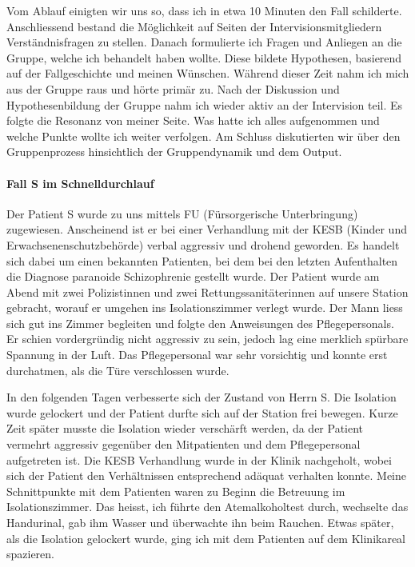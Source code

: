 Vom Ablauf einigten wir uns so, dass ich in etwa 10 Minuten den Fall schilderte. Anschliessend bestand die Möglichkeit auf Seiten der Intervisionsmitgliedern Verständnisfragen zu stellen. Danach formulierte ich Fragen und Anliegen an die Gruppe, welche ich behandelt haben wollte. Diese bildete Hypothesen, basierend auf der Fallgeschichte und meinen Wünschen. Während dieser Zeit nahm ich mich aus der Gruppe raus und hörte primär zu. Nach der Diskussion und Hypothesenbildung der Gruppe nahm ich wieder aktiv an der Intervision teil. Es folgte die Resonanz von meiner Seite. Was hatte ich alles aufgenommen und welche Punkte wollte ich weiter verfolgen. Am Schluss diskutierten wir über den Gruppenprozess hinsichtlich der Gruppendynamik und dem Output.

\paragraph{Fall S im Schnelldurchlauf}
Der Patient S wurde zu uns mittels FU (Fürsorgerische Unterbringung) zugewiesen. Anscheinend ist er bei einer Verhandlung mit der KESB (Kinder und Erwachsenenschutzbehörde) verbal aggressiv und drohend geworden. Es handelt sich dabei um einen bekannten Patienten, bei dem bei den letzten Aufenthalten die Diagnose paranoide Schizophrenie gestellt wurde. Der Patient wurde am Abend mit zwei Polizistinnen und zwei Rettungssanitäterinnen auf unsere Station gebracht, worauf er umgehen ins Isolationszimmer verlegt wurde. Der Mann liess sich gut ins Zimmer begleiten und folgte den Anweisungen des Pflegepersonals. Er schien vordergründig nicht aggressiv zu sein, jedoch lag eine merklich spürbare Spannung in der Luft. Das Pflegepersonal war sehr vorsichtig und konnte erst durchatmen, als die Türe verschlossen wurde.

In den folgenden Tagen verbesserte sich der Zustand von Herrn S. Die Isolation wurde gelockert und der Patient durfte sich auf der Station frei bewegen. Kurze Zeit später musste die Isolation wieder verschärft werden, da der Patient vermehrt aggressiv gegenüber den Mitpatienten und dem Pflegepersonal aufgetreten ist. Die KESB Verhandlung wurde in der Klinik nachgeholt, wobei sich der Patient den Verhältnissen entsprechend adäquat verhalten konnte. 
Meine Schnittpunkte mit dem Patienten waren zu Beginn die Betreuung im Isolationszimmer. Das heisst, ich führte den Atemalkoholtest durch, wechselte das Handurinal, gab ihm Wasser und überwachte ihn beim Rauchen. Etwas später, als die Isolation gelockert wurde, ging ich mit dem Patienten auf dem Klinikareal spazieren. 

